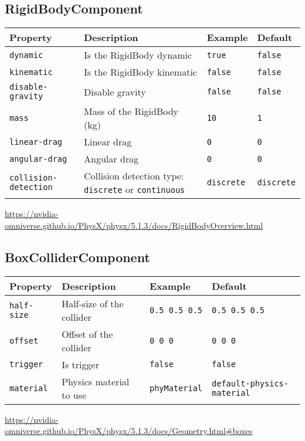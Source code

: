 \subsection{RigidBodyComponent}
\label{comp:RigidBodyComponent}
\begin{tabular}{|l|l|l|l|}
    \hline
    Property & Description & Example & Default \\ \hline
    \verb|dynamic| & Is the RigidBody dynamic & \verb|true| & \verb|false| \\ \hline
    \verb|kinematic| & Is the RigidBody kinematic & \verb|false| & \verb|false| \\ \hline
    \verb|disable-gravity| & Disable gravity & \verb|false| & \verb|false| \\ \hline
    \verb|mass| & Mass of the RigidBody (kg) & \verb|10| & \verb|1| \\ \hline
    \verb|linear-drag| & Linear drag & \verb|0| & \verb|0| \\ \hline
    \verb|angular-drag| & Angular drag & \verb|0| & \verb|0| \\ \hline
    \verb|collision-detection| & Collision detection type: \verb|discrete| or \verb|continuous| & \verb|discrete| & \verb|discrete| \\ \hline
\end{tabular}

\url{https://nvidia-omniverse.github.io/PhysX/physx/5.1.3/docs/RigidBodyOverview.html}

\subsection{BoxColliderComponent}
\label{comp:BoxColliderComponent}
\begin{tabular}{|l|l|l|l|}
    \hline
    Property & Description & Example & Default \\ \hline
    \verb|half-size| & Half-size of the collider & \verb|0.5 0.5 0.5| & \verb|0.5 0.5 0.5| \\ \hline
    \verb|offset| & Offset of the collider & \verb|0 0 0| & \verb|0 0 0| \\ \hline
    \verb|trigger| & Is trigger & \verb|false| & \verb|false| \\ \hline
    \verb|material| & Physics material to use & \verb|phyMaterial| & \verb|default-physics-material| \\ \hline
\end{tabular}

\url{https://nvidia-omniverse.github.io/PhysX/physx/5.1.3/docs/Geometry.html#boxes}


